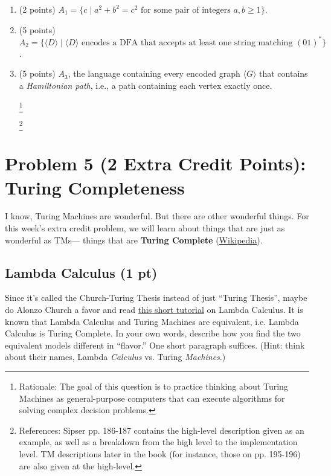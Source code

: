 \documentclass[letterpaper,11pt,twoside]{article}
\theoremstyle{plain}
\theoremstyle{definition}
\theoremstyle{remark}
\theoremstyle{restate}
\newcommand\blfootnote[1]{%
  \begingroup
  \renewcommand\thefootnote{}\footnote{#1}%
  \addtocounter{footnote}{-1}%
  \endgroup
}
\begin{document}
\begin{enumerate}
    \item (2 points) $A_1 = \{c \; | \; a^2 + b^2 = c^2 \text{ for some pair of integers } a, b \geq 1\}$.
    
    \item (5 points) $A_2 = \{ \langle D \rangle \; | \; \langle D \rangle \text{ encodes a DFA that accepts at least one string matching } (01)^*\}$.
    
    \item (5 points) $A_3$, the language containing every encoded graph $\langle G \rangle$ that contains a \emph{Hamiltonian path}, i.e., a path containing each vertex exactly once.
    
    \blfootnote{ Rationale: The goal of this question is to practice thinking about Turing Machines as general-purpose computers that can execute algorithms for solving complex decision problems. }
    \blfootnote{ References: Sipser pp. 186-187 contains the high-level description given as an example, as well as a breakdown from the high level to the implementation level. TM descriptions later in the book (for instance, those on pp. 195-196) are also given at the high-level. }
\end{enumerate}



\clearpage
\section{Problem 5 (2 Extra Credit Points): Turing Completeness}
I know, Turing Machines are wonderful. But there are other wonderful things. For this week's extra credit problem, we will learn about things that are just as wonderful as TMs— things that are \textbf{Turing Complete} (\href{https://en.wikipedia.org/wiki/Turing_completeness}{Wikipedia}).
\subsection{Lambda Calculus (1 pt)} Since it's called the Church-Turing Thesis instead of just ``Turing Thesis'', maybe do Alonzo Church a favor and read \href{https://personal.utdallas.edu/~gupta/courses/apl/lambda.pdf}{this short tutorial} on Lambda Calculus. It is known that Lambda Calculus and Turing Machines are equivalent, i.e. Lambda Calculus is Turing Complete. In your own words, describe how you find the two equivalent models different in ``flavor.'' One short paragraph suffices. (Hint: think about their names, Lambda \textit{Calculus} vs. Turing \textit{Machines}.)\\
\end{document}
